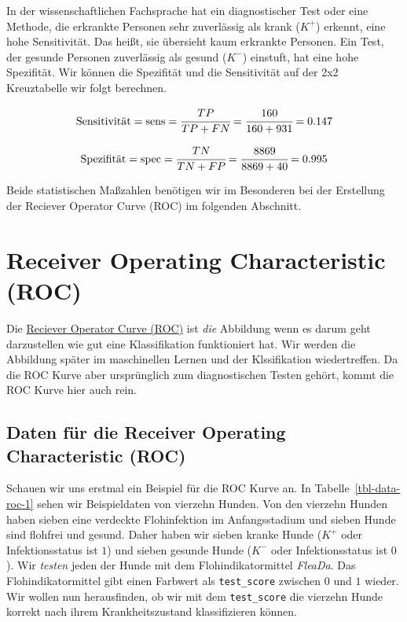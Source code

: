 \documentclass[
  letterpaper,
]{scrbook}
\begin{document}
In der wissenschaftlichen Fachsprache hat ein diagnostischer Test oder
eine Methode, die erkrankte Personen sehr zuverlässig als krank
(\(K^+\)) erkennt, eine hohe Sensitivität. Das heißt, sie übersieht kaum
erkrankte Personen. Ein Test, der gesunde Personen zuverlässig als
gesund (\(K^-\)) einstuft, hat eine hohe Spezifität. Wir können die
Spezifität und die Sensitivität auf der 2x2 Kreuztabelle wir folgt
berechnen.

\[
\mbox{Sensitivität} = \mbox{sens} = \cfrac{TP}{TP + FN} = \cfrac{160}{160 + 931} = 0.147
\]

\[
\mbox{Spezifität} = \mbox{spec} = \cfrac{TN}{TN + FP} = \cfrac{8869}{8869 + 40} = 0.995
\]

Beide statistischen Maßzahlen benötigen wir im Besonderen bei der
Erstellung der Reciever Operator Curve (ROC) im folgenden Abschnitt.

\hypertarget{receiver-operating-characteristic-roc}{%
\section{Receiver Operating Characteristic
(ROC)}\label{receiver-operating-characteristic-roc}}

Die
\href{https://en.wikipedia.org/wiki/Receiver_operating_characteristic}{Reciever
Operator Curve (ROC)} ist \emph{die} Abbildung wenn es darum geht
darzustellen wie gut eine Klassifikation funktioniert hat. Wir werden
die Abbildung später im maschinellen Lernen und der Klssifikation
wiedertreffen. Da die ROC Kurve aber ursprünglich zum diagnostischen
Testen gehört, kommt die ROC Kurve hier auch rein.

\hypertarget{daten-fuxfcr-die-receiver-operating-characteristic-roc}{%
\subsection{Daten für die Receiver Operating Characteristic
(ROC)}\label{daten-fuxfcr-die-receiver-operating-characteristic-roc}}

Schauen wir uns erstmal ein Beispiel für die ROC Kurve an. In
Tabelle~\ref{tbl-data-roc-1} sehen wir Beispieldaten von vierzehn
Hunden. Von den vierzehn Hunden haben sieben eine verdeckte
Flohinfektion im Anfangsstadium und sieben Hunde sind flohfrei und
gesund. Daher haben wir sieben kranke Hunde (\(K^+\) oder
Infektionsstatus ist \(1\)) und sieben gesunde Hunde (\(K^-\) oder
Infektionsstatus ist \(0\)). Wir \emph{testen} jeden der Hunde mit dem
Flohindikatormittel \emph{FleaDa}. Das Flohindikatormittel gibt einen
Farbwert als \texttt{test\_score} zwischen \(0\) und \(1\) wieder. Wir
wollen nun herausfinden, ob wir mit dem \texttt{test\_score} die
vierzehn Hunde korrekt nach ihrem Krankheitszustand klassifizieren
können.
\end{document}
